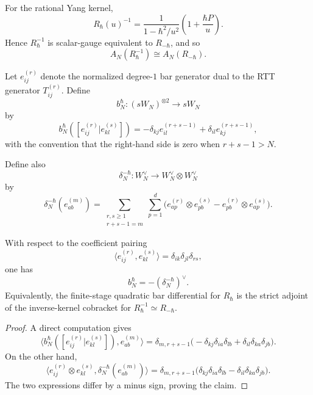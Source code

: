 \begin{corollary}
\label{cor:inverse-kernel-sign-reversal}
For the rational Yang kernel,
\[
R_\hbar(u)^{-1}
=
\frac{1}{1-\hbar^2/u^2}\left(1+\frac{\hbar P}{u}\right).
\]
Hence $R_\hbar^{-1}$ is scalar-gauge equivalent to $R_{-\hbar}$, and so
\[
A_N(R_\hbar^{-1})\cong A_N(R_{-\hbar}).
\]
\end{corollary}

\begin{definition}
\label{def:finite-stage-bar-corestriction}
Let $e_{ij}^{(r)}$ denote the normalized degree-$1$ bar generator dual to the
RTT generator $T_{ij}^{(r)}$.  Define
\[
b_N^\hbar\colon (sW_N)^{\otimes 2}\to sW_N
\]
by
\[
b_N^\hbar([e_{ij}^{(r)}|e_{kl}^{(s)}])
=
-\delta_{kj}e_{il}^{(r+s-1)}+\delta_{il}e_{kj}^{(r+s-1)},
\]
with the convention that the right-hand side is zero when $r+s-1>N$.

Define also
\[
\delta_N^{-\hbar}\colon W_N^\vee\to W_N^\vee\otimes W_N^\vee
\]
by
\[
\delta_N^{-\hbar}(e_{ab}^{(m)})
=
\sum_{\substack{r,s\ge 1\\r+s-1=m}}\sum_{p=1}^d
\bigl(e_{ap}^{(r)}\otimes e_{pb}^{(s)}-e_{pb}^{(r)}\otimes e_{ap}^{(s)}\bigr).
\]
\end{definition}

\begin{theorem}
\label{thm:finite-stage-rtt-adjointness}
With respect to the coefficient pairing
\[
\langle e_{ij}^{(r)},e_{kl}^{(s)}\rangle
=\delta_{ik}\delta_{jl}\delta_{rs},
\]
one has
\[
b_N^\hbar=-(\delta_N^{-\hbar})^\vee.
\]
Equivalently, the finite-stage quadratic bar differential for $R_\hbar$ is the
strict adjoint of the inverse-kernel cobracket for
$R_\hbar^{-1}\simeq R_{-\hbar}$.
\end{theorem}

\begin{proof}
A direct computation gives
\[
\bigl\langle b_N^\hbar([e_{ij}^{(r)}|e_{kl}^{(s)}]),e_{ab}^{(m)}\bigr\rangle
=
\delta_{m,r+s-1}
\bigl(-\delta_{kj}\delta_{ia}\delta_{lb}
+\delta_{il}\delta_{ka}\delta_{jb}\bigr).
\]
On the other hand,
\[
\bigl\langle e_{ij}^{(r)}\otimes e_{kl}^{(s)},\delta_N^{-\hbar}(e_{ab}^{(m)})\bigr\rangle
=
\delta_{m,r+s-1}
\bigl(\delta_{kj}\delta_{ia}\delta_{lb}
-\delta_{il}\delta_{ka}\delta_{jb}\bigr).
\]
The two expressions differ by a minus sign, proving the claim.
\end{proof}

